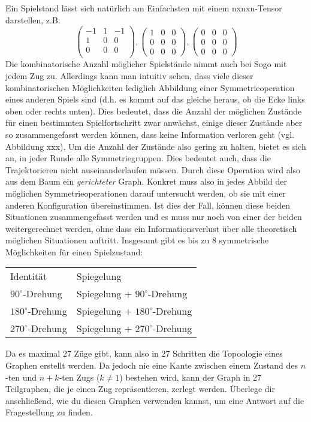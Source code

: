 \documentclass[paper=A4, pagesize, DIV=calc, smallheadings,
fontsize=11pt, expansion=false]{scrreprt}
\begin{document}
Ein Spielstand lässt sich natürlich am Einfachsten mit einem nxnxn-Tensor darstellen, z.B. 
\[
 \begin{pmatrix}
-1 & 1 & -1 \\
1 & 0 & 0  \\
0 & 0 & 0 \\ 
\end{pmatrix},
\begin{pmatrix}
   1 & 0  & 0 \\
0 & 0 & 0 \\
0 & 0 & 0 
\end{pmatrix},
\begin{pmatrix}
  0 & 0  & 0 \\
  0 & 0 & 0 \\
  0 & 0 & 0 
\end{pmatrix} 
\]
Die kombinatorische Anzahl möglicher Spielstände nimmt auch bei Sogo mit jedem Zug zu. 
Allerdings kann man intuitiv sehen, dass viele dieser kombinatorischen Möglichkeiten lediglich Abbildung einer Symmetrieoperation eines anderen Spiels sind (d.h. es kommt auf das gleiche heraus, ob die Ecke links oben oder rechts unten). 
Dies bedeutet, dass die Anzahl der möglichen Zustände für einen bestimmten Spielfortschritt zwar anwächst, einige dieser Zustände aber so zusammengefasst werden können, dass keine Information verloren geht (vgl. Abbildung xxx). 
Um die Anzahl der Zustände also gering zu halten, bietet es sich an, in jeder Runde alle Symmetriegruppen. Dies bedeutet auch, dass die Trajektorieren nicht auseinanderlaufen müssen. Durch diese Operation wird also aus dem Baum ein \emph{gerichteter} Graph.
Konkret muss also in jedes Abbild der möglichen Symmetrieoperationen darauf untersucht werden, ob sie mit einer anderen Konfiguration übereinstimmen. Ist dies der Fall, können diese beiden Situationen zusammengefasst werden und es muss nur noch von einer der beiden weitergerechnet werden, ohne dass ein Informationsverlust über alle theoretisch möglichen Situationen auftritt.
Insgesamt gibt es bis zu 8 symmetrische Möglichkeiten für einen Spielzustand:
\begin{tabular}{ll}
Identität & Spiegelung \\
$90^\circ$-Drehung & Spiegelung + $90^\circ$-Drehung \\
$180^\circ$-Drehung & Spiegelung + $180^\circ$-Drehung \\
$270^\circ$-Drehung & Spiegelung + $270^\circ$-Drehung 
\end{tabular}
Da es maximal 27 Züge gibt, kann also in 27 Schritten die Topoologie eines Graphen erstellt werden. Da jedoch nie eine Kante zwischen einem Zustand des $n$-ten und $n+k$-ten Zugs ($ k \neq 1 $) bestehen wird, kann der Graph in 27 Teilgraphen, die je einen Zug repräsentieren, zerlegt werden. Überlege dir anschließend, wie du diesen Graphen verwenden kannst, um eine Antwort auf die Fragestellung zu finden.
\end{document}
